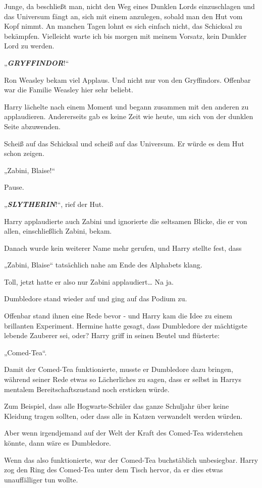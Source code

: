 {Junge, da beschließt man, nicht den Weg eines Dunklen Lords einzuschlagen und das Universum fängt an, sich mit einem anzulegen, sobald man den Hut vom Kopf nimmt. An manchen Tagen lohnt es sich einfach nicht, das Schicksal zu bekämpfen. Vielleicht warte ich bis morgen mit meinem Vorsatz, kein Dunkler Lord zu werden.

„\textbf{\emph{GRYFFINDOR}}!“

Ron Weasley bekam viel Applaus. Und nicht nur von den Gryffindors. Offenbar war die Familie Weasley hier sehr beliebt.

Harry lächelte nach einem Moment und begann zusammen mit den anderen zu applaudieren. Andererseits gab es keine Zeit wie heute, um sich von der dunklen Seite abzuwenden.

Scheiß auf das Schicksal und scheiß auf das Universum. Er würde es dem Hut schon zeigen.

„Zabini, Blaise!“

Pause.

„\textbf{\emph{SLYTHERIN}}!“, rief der Hut.

Harry applaudierte auch Zabini und ignorierte die seltsamen Blicke, die er von allen, einschließlich Zabini, bekam.

Danach wurde kein weiterer Name mehr gerufen, und Harry stellte fest, dass

„Zabini, Blaise“ tatsächlich nahe am Ende des Alphabets klang.

Toll, jetzt hatte er also nur Zabini applaudiert… Na ja.

Dumbledore stand wieder auf und ging auf das Podium zu.

Offenbar stand ihnen eine Rede bevor - und Harry kam die Idee zu einem brillanten Experiment. Hermine hatte gesagt, dass Dumbledore der mächtigste lebende Zauberer sei, oder? Harry griff in seinen Beutel und flüsterte:

„Comed-Tea“.

Damit der Comed-Tea funktionierte, musste er Dumbledore dazu bringen, während seiner Rede etwas so Lächerliches zu sagen, dass er selbst in Harrys mentalem Bereitschaftszustand noch ersticken würde.

Zum Beispiel, dass alle Hogwarts-Schüler das ganze Schuljahr über keine Kleidung tragen sollten, oder dass alle in Katzen verwandelt werden würden.

Aber wenn irgendjemand auf der Welt der Kraft des Comed-Tea widerstehen könnte, dann wäre es Dumbledore.

Wenn das also funktionierte, war der Comed-Tea buchstäblich unbesiegbar. Harry zog den Ring des Comed-Tea unter dem Tisch hervor, da er dies etwas unauffälliger tun wollte.

}
